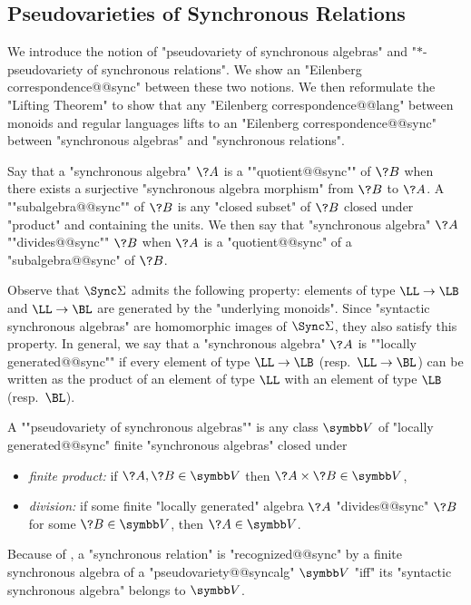 \subsection{Pseudovarieties of Synchronous Relations}
\label{sec:varieties}

We introduce the notion of "pseudovariety of synchronous algebras" 
and "$\ast$-pseudovariety of synchronous relations". We show an "Eilenberg correspondence@@sync" between these two notions. We then reformulate the "Lifting Theorem"
to show that any "Eilenberg correspondence@@lang" between monoids and regular languages
lifts to an "Eilenberg correspondence@@sync" between "synchronous algebras" and "synchronous relations".

Say that a "synchronous algebra" $\?A$ is a \AP""quotient@@sync"" of $\?B$
when there exists a surjective "synchronous algebra morphism" from $\?B$ to $\?A$.
A ""subalgebra@@sync"" of $\?B$ is any "closed subset" of $\?B$ closed under "product"
and containing the units.
We then say that "synchronous algebra" $\?A$ \AP""divides@@sync"" $\?B$
when $\?A$ is a "quotient@@sync" of a "subalgebra@@sync" of $\?B$.

Observe that $\Sync\Sigma$ admits the following property:
elements of type $\LL\to\LB$ and $\LL\to\BL$ are generated by the "underlying monoids".
Since "syntactic synchronous algebras" are homomorphic images of $\Sync\Sigma$, they also
satisfy this property. In general, we say that a "synchronous algebra" $\?A$ is \AP""locally 
generated@@sync"" if every element of type $\LL\to\LB$ (resp.~$\LL\to\BL$)
can be written as the product of an element of type $\LL$ with an element of type $\LB$ (resp.~$\BL$).

A \AP""pseudovariety of synchronous algebras"" is any class $\B{V}$
of "locally generated@@sync" finite "synchronous algebras" closed under
\begin{itemize}
	\item \emph{finite product:} if $\?A, \?B \in \B{V}$ then $\?A \times \?B \in \B{V}$,
	\item \emph{division:} if some finite "locally generated" algebra $\?A$ "divides@@sync" $\?B$ for some $\?B \in \B{V}$, then $\?A \in \B{V}$.
\end{itemize}

Because of , a "synchronous relation" is "recognized@@sync"
by a finite synchronous algebra of a "pseudovariety@@syncalg" $\B{V}$ "iff"
its "syntactic synchronous algebra" belongs to $\B{V}$.

